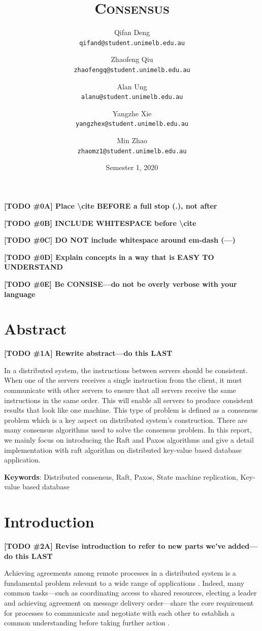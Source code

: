 \documentclass[12pt, a4paper]{article}
\title{\textsc{Consensus}}
\author{
  Qifan Deng \\
  \texttt{\small qifand@student.unimelb.edu.au}
  \and
  Zhaofeng Qiu \\
  \texttt{\small zhaofengq@student.unimelb.edu.au}
  \and
  Alan Ung \\
  \texttt{\small alanu@student.unimelb.edu.au}
  \and
  Yangzhe Xie \\
  \texttt{\small yangzhex@student.unimelb.edu.au}
  \and
  Min Zhao \\
  \texttt{\small zhaomz1@student.unimelb.edu.au}
}
\date{Semester 1, 2020}
\newcommand{\todo}[2]{\textbf{\color{blue}[TODO \##1] #2}\par}
\begin{document}
\maketitle
\thispagestyle{firststyle}

\todo{0A}{Place \textbackslash cite BEFORE a full stop (.), not after}
\todo{0B}{INCLUDE WHITESPACE before \textbackslash cite}
\todo{0C}{DO NOT include whitespace around em-dash (---)}
\todo{0D}{Explain concepts in a way that is EASY TO UNDERSTAND}
\todo{0E}{Be CONSISE---do not be overly verbose with your language}


\section{Abstract}

\todo{1A}{Rewrite abstract---do this LAST}

In a distributed system, the instructions between servers should be consistent. When one of the servers receives a single instruction from the client, it must communicate with other servers to ensure that all servers receive the same instructions in the same order. This will enable all servers to produce consistent results that look like one machine. This type of problem is defined as a consensus problem which is a key aspect on distributed system’s construction. There are many consensus algorithms used to solve the consensus problem. In this report, we mainly focus on introducing the Raft and Paxos algorithms and give a detail implementation with raft algorithm on distributed key-value based database application.

\textbf{Keywords}: Distributed consensus, Raft, Paxos, State machine replication, Key-value based database


\section{Introduction}

\todo{2A}{Revise introduction to refer to new parts we've added---do this LAST}

Achieving agreements among remote processes in a distributed system is a fundamental problem relevant to a wide range of applications \cite{fischer1985impossibility, kshemkalyani_singhal_2008}. Indeed, many common tasks---such as coordinating access to shared resources, electing a leader and achieving agreement on message delivery order---share the core requirement for processes to communicate and negotiate with each other to establish a common understanding before taking further action \cite{kshemkalyani_singhal_2008, coulouris2005distributed}.
\end{document}
